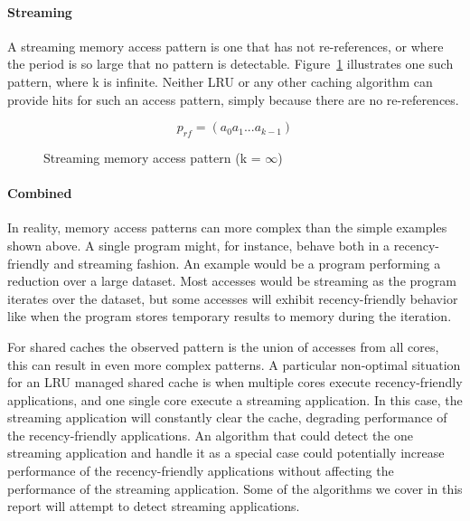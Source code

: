 \paragraph{Streaming}
A streaming memory access pattern is one that has not re-references, or where the period is so large that no pattern is detectable.
Figure~\ref{fig:background:algorithms:st_pattern} illustrates one such pattern, where k is infinite.
Neither LRU or any other caching algorithm can provide hits for such an access pattern, simply because there are no re-references.

\begin{figure}[ht]
\centering
\begin{equation}
p_{rf} = (a_0 a_1 ... a_{k-1})
\end{equation}
\caption{Streaming memory access  pattern (k = $\infty$) }
\label{fig:background:algorithms:st_pattern}
\end{figure}

\paragraph{Combined}
In reality, memory access patterns can more complex than the simple examples shown above.
A single program might, for instance, behave both in a recency-friendly and streaming fashion. 
An example would be a program performing a reduction over a large dataset.
Most accesses would be streaming as the program iterates over the dataset, but some accesses will exhibit recency-friendly behavior like when the program stores temporary results to memory during the iteration.

For shared caches the observed pattern is the union of accesses from all cores, this can result in even more complex patterns.
A particular non-optimal situation for an LRU managed shared cache is when multiple cores execute recency-friendly applications, and one single core execute a streaming application.
In this case, the streaming application will constantly clear the cache, degrading performance of the recency-friendly applications.
An algorithm that could detect the one streaming application and handle it as a special case could potentially increase performance of the recency-friendly applications without affecting the performance of the streaming application.
Some of the algorithms we cover in this report will attempt to detect streaming applications.